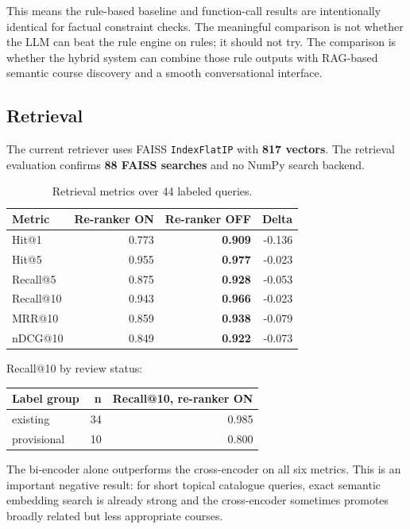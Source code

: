 \documentclass[10pt,letterpaper]{article}
\newcommand{\code}[1]{\texttt{#1}}
\begin{document}
This means the rule-based baseline and function-call results are intentionally identical for factual constraint checks. The meaningful comparison is not whether the LLM can beat the rule engine on rules; it should not try. The comparison is whether the hybrid system can combine those rule outputs with RAG-based semantic course discovery and a smooth conversational interface.

\subsection{Retrieval}
The current retriever uses FAISS \code{IndexFlatIP} with \textbf{817 vectors}. The retrieval evaluation confirms \textbf{88 FAISS searches} and no NumPy search backend.

\begin{table}[h]
\centering
\small
\begin{tabular}{@{}lrrr@{}}
\toprule
\textbf{Metric} & \textbf{Re-ranker ON} & \textbf{Re-ranker OFF} & \textbf{Delta} \\
\midrule
Hit@1 & 0.773 & \textbf{0.909} & -0.136 \\
Hit@5 & 0.955 & \textbf{0.977} & -0.023 \\
Recall@5 & 0.875 & \textbf{0.928} & -0.053 \\
Recall@10 & 0.943 & \textbf{0.966} & -0.023 \\
MRR@10 & 0.859 & \textbf{0.938} & -0.079 \\
nDCG@10 & 0.849 & \textbf{0.922} & -0.073 \\
\bottomrule
\end{tabular}
\caption{Retrieval metrics over 44 labeled queries.}
\end{table}

Recall@10 by review status:

\begin{table}[h]
\centering
\small
\begin{tabular}{@{}lrr@{}}
\toprule
\textbf{Label group} & \textbf{n} & \textbf{Recall@10, re-ranker ON} \\
\midrule
existing & 34 & 0.985 \\
provisional & 10 & 0.800 \\
\bottomrule
\end{tabular}
\end{table}

The bi-encoder alone outperforms the cross-encoder on all six metrics. This is an important negative result: for short topical catalogue queries, exact semantic embedding search is already strong and the cross-encoder sometimes promotes broadly related but less appropriate courses.
\end{document}

